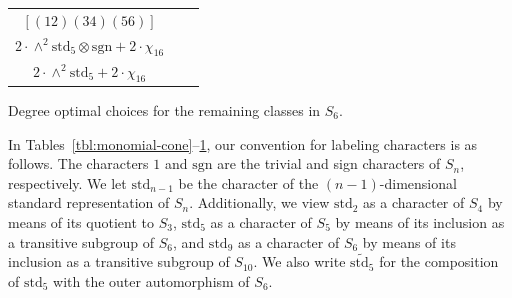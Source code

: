 \documentclass[12pt]{amsart}
\theoremstyle{definition} \newtheorem{definition}[theorem]{Definition}
\theoremstyle{example} \newtheorem{example}[theorem]{Example}
\theoremstyle{remark} \newtheorem{remark}{Remark}[theorem]
\numberwithin{equation}{section}
\numberwithin{theorem}{section}
\newcommand{\sgn}{\mathrm{sgn}}
\newcommand{\std}{\mathrm{std}}
\begin{document}
{\begin{table}[h]
\begin{tabular}{|c|c|c|}
				& {\tiny \makecell[t]{
					$\std_5 + \std_5\otimes\sgn + \std_9+\std_9\otimes\sgn + 2\cdot \chi_{16} $
				}}
				\\ \hline
				$[(12)(34)(56)]$ & {\tiny \makecell[t]{$1 + \std_5\otimes\sgn + 3\cdot \widetilde{\std_5} + 3\cdot \std_9 +$ \\ $ 2\cdot \wedge^2\std_5\otimes\sgn + 2\cdot \chi_{16}$} }
				& {\tiny \makecell[t]{
					$\sgn + \std_5 + 3\cdot \widetilde{\std_5}\otimes\sgn + 3\cdot \std_9\otimes\sgn +$ \\ $ 2\cdot \wedge^2\std_5 + 2\cdot \chi_{16} $
				}}
				\\ \hline
		\end{tabular}
		\begin{caption}{\label{tbl:basepoints-6} Degree optimal choices for the remaining classes in $S_6$.}
		\end{caption}
	\end{table}}
	
	In Tables~\ref{tbl:monomial-cone}--\ref{tbl:basepoints-6}, our convention for labeling characters is as follows.  The characters $1$ and $\mathrm{sgn}$ are the trivial and sign characters of $S_n$, respectively.  We let $\mathrm{std}_{n-1}$ be the character of the $(n-1)$-dimensional standard representation of $S_n$.  Additionally, we view $\mathrm{std}_2$ as a character of $S_4$ by means of its quotient to $S_3$, $\mathrm{std}_5$ as a character of $S_5$ by means of its inclusion as a transitive subgroup of $S_6$, and $\mathrm{std}_9$ as a character of $S_6$ by means of its inclusion as a transitive subgroup of $S_{10}$.  We also write $\widetilde{\mathrm{std}_5}$ for the composition of $\mathrm{std}_5$ with the outer automorphism of $S_6$.
\end{document}
